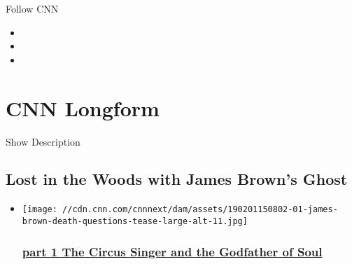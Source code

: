 Follow CNN

\begin{itemize}
\item
\item
\item
\end{itemize}

\hypertarget{cnn-longform}{%
\section{CNN Longform}\label{cnn-longform}}

Show Description

\hypertarget{lost-in-the-woods-with-james-browns-ghost-}{%
\subsection{Lost in the Woods with James Brown's
Ghost~}\label{lost-in-the-woods-with-james-browns-ghost-}}

\begin{itemize}
\item
  \href{https://www.cnn.com/interactive/2019/02/us/james-brown-death-questions/}{}

  \texttt{[image: //cdn.cnn.com/cnnnext/dam/assets/190201150802-01-james-brown-death-questions-tease-large-alt-11.jpg]}

  \hypertarget{part-1-the-circus-singer-and-the-godfather-of-soul}{%
  \subsubsection{\texorpdfstring{\href{https://www.cnn.com/interactive/2019/02/us/james-brown-death-questions/}{part
  1 The Circus Singer and the Godfather of
  Soul}}{part 1 The Circus Singer and the Godfather of Soul}}\label{part-1-the-circus-singer-and-the-godfather-of-soul}}
\end{itemize}

